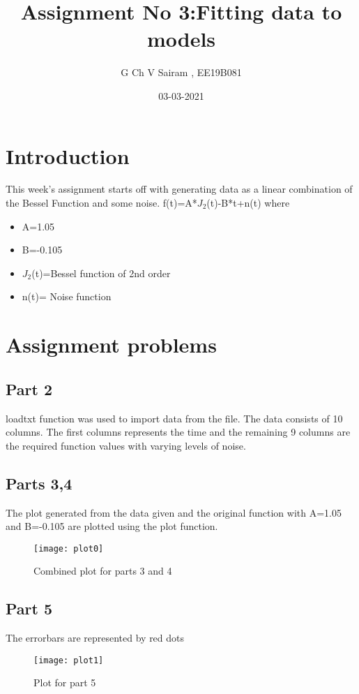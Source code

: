 \documentclass[11pt, a4paper]{article}
\title{Assignment No 3:Fitting data to models}
\author{G Ch V Sairam , EE19B081}
\date{03-03-2021}
\begin{document}
		
		
\maketitle 
\section{Introduction}

This week's assignment starts off with generating data as a linear combination
of the Bessel Function and some noise.
f(t)=A*$J_2$(t)-B*t+n(t)
where
\begin{itemize}
  	\item A=1.05
  	\item B=-0.105
  	\item $J_2$(t)=Bessel function of 2nd order
  	\item n(t)= Noise function
\end{itemize}
  
\section*{Assignment problems}
\subsection*{Part 2}
loadtxt function was used to import data from the file.
The data consists of 10 columns. The first columns represents the time and the remaining 9 columns are the required function values with varying levels of noise.

\subsection*{Parts 3,4}
The plot generated from the data given and the original function with A=1.05 and B=-0.105 are plotted using the plot function.

   \begin{figure}[!tbh]
   	\centering
   	\texttt{[image: plot0]}   
   	\caption{Combined plot for parts 3 and 4}
   	\label{fig:plot0}
   \end{figure} 

\subsection*{Part 5}
The errorbars are represented by red dots
\begin{figure}[!tbh]
	\centering
	\texttt{[image: plot1]}
	\caption{Plot for part 5}
	\label{fig:plot1}
\end{figure}
\end{document}
